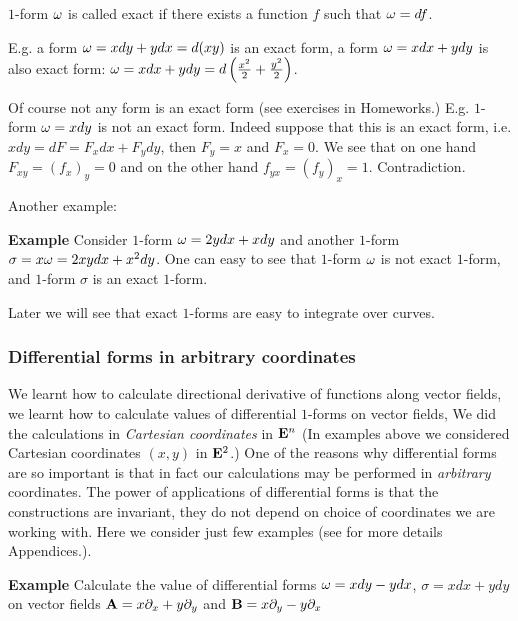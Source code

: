 \documentclass[12pt]{article}
\numberwithin{equation}{section}
\begin{document}
 
$1$-form ${\omega}$ is called exact if there exists a function $f$ such that ${\omega}=df$.

E.g. a form ${\omega}=xdy+ydx=d(xy)$ is an exact form,
a form ${\omega}=xdx+ydy$  is also exact form: ${\omega}=xdx+ydy=
d\left({x^2\over 2}+{y^2\over 2}\right)$.  

Of course not any form is an exact form 
(see exercises in Homeworks.)
E.g. $1$-form ${\omega}=xdy$ is not an exact form. Indeed suppose that
this is an exact form, i.e.
$xdy=dF=F_xdx+F_ydy$, then $F_y=x$ and $F_x=0$. We see that on one hand
$F_{xy}=(f_x)_y=0$ and on the other hand $f_{yx}=(f_y)_x=1$.
Contradiction.

Another example:

{\bf Example}  Consider $1$-form ${\omega}=2ydx+xdy$ and another $1$-form
$\sigma=x{\omega}=2xydx+x^2dy$. One can easy to see that
  $1$-form ${\omega}$ is not exact $1$-form, and $1$-form $\sigma$
is an exact $1$-form.

Later we will see that exact $1$-forms are easy to integrate over curves.

\subsubsection {Differential forms in arbitrary coordinates}
\label{powerofdifforms1}

  We learnt how to calculate directional derivative
of functions along vector fields, we learnt how to calculate 
values of differential $1$-forms
on vector fields,  We did the calculations
in {\it Cartesian coordinates} in ${\bf E}^n$ (In examples above we considered
Cartesian coordinates $(x,y)$ in ${\bf E}^2$.)
One of the reasons why differential forms are so important is
that in fact our calculations may be performed in {\it arbitrary}
coordinates.   The power of applications of differential forms is that
the constructions are invariant, they do not depend on choice of
coordinates we are working with.  Here we consider just few
examples (see for more details Appendices.).

 {\bf Example}  Calculate the value of differential forms 
${\omega}=xdy-ydx$, $\sigma=xdx+ydy$ on vector fields ${\bf A}=x\partial_x+y\partial_y$
and ${\bf B}={x\partial_y-y\partial_x}$
\end{document}
